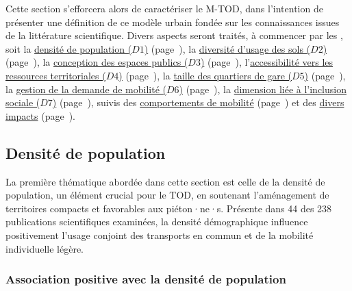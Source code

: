 \begin{refsegment}
Cette section s'efforcera alors de caractériser le \acrshort{M-TOD}, dans l'intention de présenter une définition de ce modèle urbain fondée sur les connaissances issues de la littérature scientifique. Divers aspects seront traités, à commencer par les , soit la \hyperref[chap2:densite-population]{densité de population (\(D1\))} (page~\pageref{chap2:densite-population}), la \hyperref[chap2:diversite-fonctionnelle]{diversité d'usage des sols (\(D2\))} (page~\pageref{chap2:diversite-fonctionnelle}), la \hyperref[chap2:traitement-espaces-publics]{conception des espaces publics (\(D3\))} (page~\pageref{chap2:traitement-espaces-publics}), l'\hyperref[chap2:accessibilite-intermodale]{accessibilité vers les ressources territoriales (\(D4\))} (page~\pageref{chap2:accessibilite-intermodale}), la \hyperref[chap2:distances-premiers-derniers-km]{taille des quartiers de gare (\(D5\))} (page~\pageref{chap2:distances-premiers-derniers-km}), la \hyperref[chap2:gestion-demande-mobilite]{gestion de la demande de mobilité (\(D6\))} (page~\pageref{chap2:gestion-demande-mobilite}), la \hyperref[chap2:sociodemographie-usagers]{dimension liée à l'inclusion sociale (\(D7\))} (page~\pageref{chap2:sociodemographie-usagers}), suivis des \hyperref[chap2:comportements-mobilite]{comportements de mobilité} (page~\pageref{chap2:comportements-mobilite}) et des \hyperref[chap2:impacts-systemes-urbain-mobilite]{divers impacts} (page~\pageref{chap2:impacts-systemes-urbain-mobilite}).%

\subsection{Densité de population
    \label{chap2:densite-population}
    }
    
La première thématique abordée dans cette section est celle de la densité de population, un élément crucial pour le \acrshort{TOD}, en soutenant l'aménagement de territoires compacts et favorables aux piéton·ne·s. Présente dans 44 des 238 publications scientifiques examinées, la densité démographique influence positivement l'usage conjoint des transports en commun et de la mobilité individuelle légère.%

\subsubsection*{Association positive avec la densité de population
    \label{chap2:association-positive-densite-population}
    }
    

\end{refsegment}
